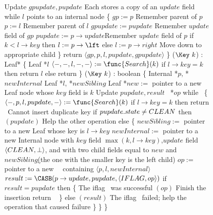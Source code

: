 \begin{figure*}
\begin{code}
		Update $gpupdate, pupdate$ \tabtabcom Each stores a copy of an $update$ field\bl\nlc
		while $l$ points to an internal node \{ \nlc%
		\n         $gp := p$ \tabtabcom Remember parent of $p$\nlc
		$p := l$ \tabtabcom Remember parent of $l$\nlc
		$gpupdate := pupdate$ \tabtabcom Remember $update$ field of $gp$\nlc
		$pupdate := p\rightarrow update$\label{store-pupdate}\tabtabcom Remember $update$ field of $p$\nlc  
		if $k < l\rightarrow key$ then $l:= p\rightarrow \lft$ else $l:=p \rightarrow right$ \label{read-child}\tabtabcom Move down to appropriate child\nlc
		\p \} \nlc
		return $\langle gp, p, l, pupdate, gpupdate \rangle$ \nlc
		\p 
		\}\bl
		\nlc
		($\Key\ k$) : Leaf* \{ \nlc
		\n   Leaf *$l$\bl
		\nlc
		$\langle -,-,l,-,-\rangle := \func{Search}(k)$\nlc
		if $l\rightarrow key = k$ then return $l$\nlc
		else return \NULL\nlc
		\p
		\}\bl
		\nlc
		($\Key\ k$) : boolean \{ \nlc
		\n Internal *$p$, *$newInternal$\nlc 
		Leaf *$l$, *$newSibling$\nlc 
		Leaf *$new :=$ pointer to a new Leaf node whose $key$ field is $k$  \nlc
		Update $pupdate, result$\nlc
		\IFlag\ *$op$\bl\nlc%
		while \TRUE\ \{  \nlc
		\n $\langle -, p, l, pupdate, - \rangle := \func{Search}(k)$ \label{ins-search}\nlc
		if $l \rightarrow key = k$ then return \FALSE\ \tabtabcom Cannot insert duplicate key\label{insert-false}\nlc
		if $pupdate.state \neq C\scriptsize LEAN \normalsize$ then $(pupdate)$ \tabtabcom Help the other operation \label{ins-help-unclean}\nlc
		else \{\nlc
		\n        $newSibling :=$ pointer to a new Leaf whose key is $l\rightarrow key$\nlc
		$newInternal :=$ pointer to a new Internal node with $key$ field $\max(k, l \rightarrow key)$,\label{create-internal}\ul      
		\n      $update$ field $\langle C\scriptsize LEAN \normalsize, \perp\rangle$, and with two
		child fields equal to $new$ and $newSibling$\ul 
		(the one with the smaller key is the left child)\nlc
		\p        $op :=$ pointer to a new \IFlag\ \record\  containing $\langle p, l, newInternal\rangle$\label{new-IFlag}\nlc
		$result := \CASB(p\rightarrow update, pupdate, \langle \insertflag, op\rangle)$ \label{iflag-cas} \nlc
		if $result = pupdate$ then \{ \tabtabcom The iflag \CASB\ was successful\nlc
		\n            {}$(op)$ \tabtabcom Finish the insertion\label{finish-insert}\nlc
		return \TRUE\ \label{insert-true}\nlc
		\p        \}\nlc 
		else $(result)$ \tabcom The iflag \CASB\ failed; help the operation that caused failure\label{ins-help-after-failure}\nlc
		\p    \}\nlc
		\p\}\nlc 
		\p
		\}\bl
		\nlc
		

\end{code}
\end{figure*}
